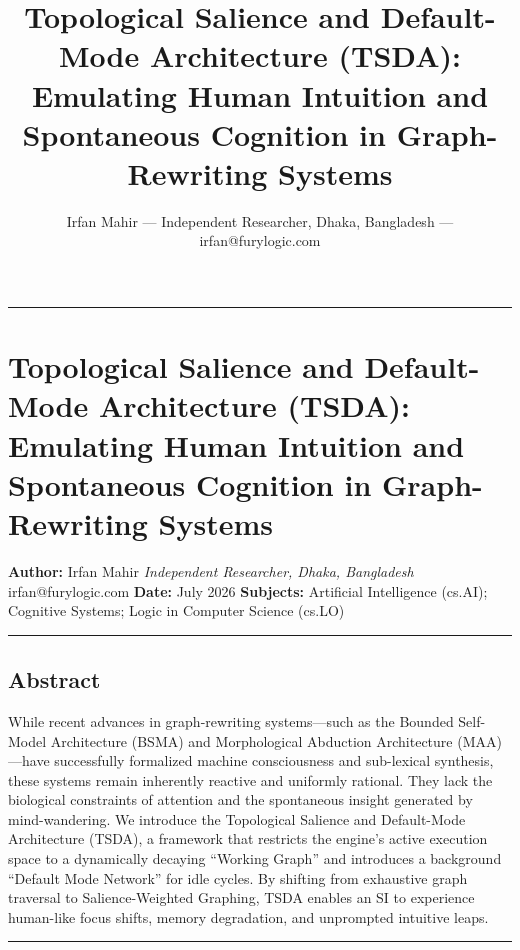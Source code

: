 \documentclass[
  11pt,
  a4paper,
]{article}
\title{Topological Salience and Default-Mode Architecture (TSDA):
Emulating Human Intuition and Spontaneous Cognition in Graph-Rewriting
Systems}
\author{Irfan Mahir --- Independent Researcher, Dhaka, Bangladesh ---
irfan@furylogic.com}
\date{}
\begin{document}
\maketitle

{
\hypersetup{linkcolor=}
\setcounter{tocdepth}{3}
\tableofcontents
}
\begin{center}\rule{0.5\linewidth}{0.5pt}\end{center}

\section{Topological Salience and Default-Mode Architecture (TSDA):
Emulating Human Intuition and Spontaneous Cognition in Graph-Rewriting
Systems}\label{topological-salience-and-default-mode-architecture-tsda-emulating-human-intuition-and-spontaneous-cognition-in-graph-rewriting-systems}

\textbf{Author:} Irfan Mahir \emph{Independent Researcher, Dhaka,
Bangladesh} irfan@furylogic.com \textbf{Date:} July 2026
\textbf{Subjects:} Artificial Intelligence (cs.AI); Cognitive Systems;
Logic in Computer Science (cs.LO)

\begin{center}\rule{0.5\linewidth}{0.5pt}\end{center}

\subsection{Abstract}\label{abstract}

While recent advances in graph-rewriting systems---such as the Bounded
Self-Model Architecture (BSMA) and Morphological Abduction Architecture
(MAA)---have successfully formalized machine consciousness and
sub-lexical synthesis, these systems remain inherently reactive and
uniformly rational. They lack the biological constraints of attention
and the spontaneous insight generated by mind-wandering. We introduce
the Topological Salience and Default-Mode Architecture (TSDA), a
framework that restricts the engine's active execution space to a
dynamically decaying ``Working Graph'' and introduces a background
``Default Mode Network'' for idle cycles. By shifting from exhaustive
graph traversal to Salience-Weighted Graphing, TSDA enables an SI to
experience human-like focus shifts, memory degradation, and unprompted
intuitive leaps.

\begin{center}\rule{0.5\linewidth}{0.5pt}\end{center}
\end{document}
